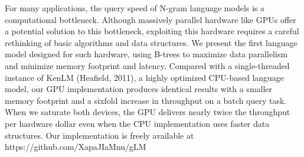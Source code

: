 For many applications, the query speed of N-gram language models is a computational bottleneck. Although massively parallel hardware like GPUs offer a potential solution to this bottleneck, exploiting this hardware requires a careful rethinking of basic algorithms and data structures. We present the first language model designed for such hardware, using B-trees to maximize data parallelism and minimize memory footprint and latency. Compared with a single-threaded instance of KenLM (Heafield, 2011), a highly optimized CPU-based language model, our GPU implementation produces identical results with a smaller memory footprint and a sixfold increase in throughput on a batch query task. When we saturate both devices, the GPU delivers nearly twice the throughput per hardware dollar even when the CPU implementation uses faster data structures. Our implementation is freely available at https://github.com/XapaJIaMnu/gLM
